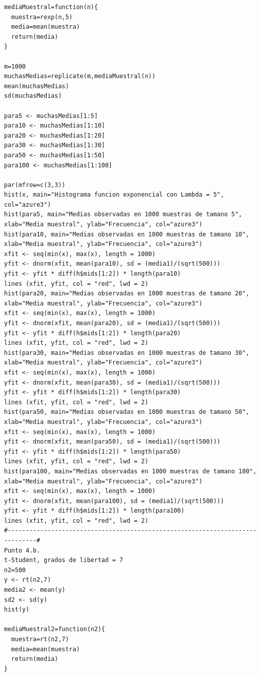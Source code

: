 \documentclass[letterpaper,12pt,onecolumn,titlepage]{article}
\begin{document}
\begin{verbatim}
mediaMuestral=function(n){
  muestra=rexp(n,5)
  media=mean(muestra)
  return(media)
}

m=1000
muchasMedias=replicate(m,mediaMuestral(n))
mean(muchasMedias)
sd(muchasMedias)

para5 <- muchasMedias[1:5]
para10 <- muchasMedias[1:10]
para20 <- muchasMedias[1:20]
para30 <- muchasMedias[1:30]
para50 <- muchasMedias[1:50]
para100 <- muchasMedias[1:100]

par(mfrow=c(3,3))
hist(x, main="Histograma funcion exponencial con Lambda = 5", col="azure3")
hist(para5, main="Medias observadas en 1000 muestras de tamano 5", xlab="Media muestral", ylab="Frecuencia", col="azure3")
hist(para10, main="Medias observadas en 1000 muestras de tamano 10", xlab="Media muestral", ylab="Frecuencia", col="azure3")
xfit <- seq(min(x), max(x), length = 1000)
yfit <- dnorm(xfit, mean(para10), sd = (media1)/(sqrt(500)))
yfit <- yfit * diff(h$mids[1:2]) * length(para10)
lines (xfit, yfit, col = "red", lwd = 2)
hist(para20, main="Medias observadas en 1000 muestras de tamano 20", xlab="Media muestral", ylab="Frecuencia", col="azure3")
xfit <- seq(min(x), max(x), length = 1000)
yfit <- dnorm(xfit, mean(para20), sd = (media1)/(sqrt(500)))
yfit <- yfit * diff(h$mids[1:2]) * length(para20)
lines (xfit, yfit, col = "red", lwd = 2)
hist(para30, main="Medias observadas en 1000 muestras de tamano 30", xlab="Media muestral", ylab="Frecuencia", col="azure3")
xfit <- seq(min(x), max(x), length = 1000)
yfit <- dnorm(xfit, mean(para30), sd = (media1)/(sqrt(500)))
yfit <- yfit * diff(h$mids[1:2]) * length(para30)
lines (xfit, yfit, col = "red", lwd = 2)
hist(para50, main="Medias observadas en 1000 muestras de tamano 50", xlab="Media muestral", ylab="Frecuencia", col="azure3")
xfit <- seq(min(x), max(x), length = 1000)
yfit <- dnorm(xfit, mean(para50), sd = (media1)/(sqrt(500)))
yfit <- yfit * diff(h$mids[1:2]) * length(para50)
lines (xfit, yfit, col = "red", lwd = 2)
hist(para100, main="Medias observadas en 1000 muestras de tamano 100", xlab="Media muestral", ylab="Frecuencia", col="azure3")
xfit <- seq(min(x), max(x), length = 1000)
yfit <- dnorm(xfit, mean(para100), sd = (media1)/(sqrt(500)))
yfit <- yfit * diff(h$mids[1:2]) * length(para100)
lines (xfit, yfit, col = "red", lwd = 2)
#------------------------------------------------------------------------------#
Punto 4.b.
t-Student, grados de libertad = 7 
n2=500
y <- rt(n2,7)
media2 <- mean(y)
sd2 <- sd(y)
hist(y)

mediaMuestral2=function(n2){
  muestra=rt(n2,7)
  media=mean(muestra)
  return(media)
}


\end{verbatim}
\end{document}
